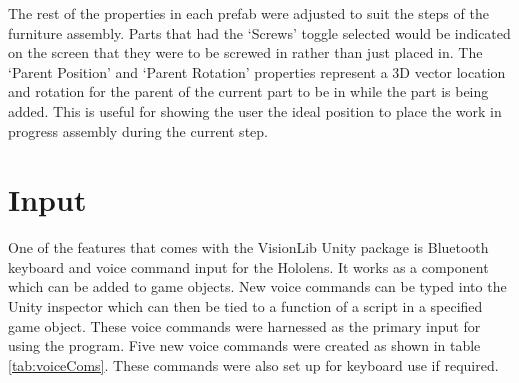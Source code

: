 \documentclass{l4proj}
\begin{document}
The rest of the properties in each prefab were adjusted to suit the steps of the furniture assembly. Parts that had the `Screws' toggle selected would be indicated on the screen that they were to be screwed in rather than just placed in. The `Parent Position' and `Parent Rotation' properties represent a 3D vector location and rotation for the parent of the current part to be in while the part is being added. This is useful for showing the user the ideal position to place the work in progress assembly during the current step.

\section{Input}

One of the features that comes with the VisionLib Unity package is Bluetooth keyboard and voice command input for the Hololens. It works as a component which can be added to game objects. New voice commands can be typed into the Unity inspector which can then be tied to a function of a script in a specified game object. These voice commands were harnessed as the primary input for using the program. Five new voice commands were created as shown in table \ref{tab:voiceComs}. These commands were also set up for keyboard use if required.
\end{document}
